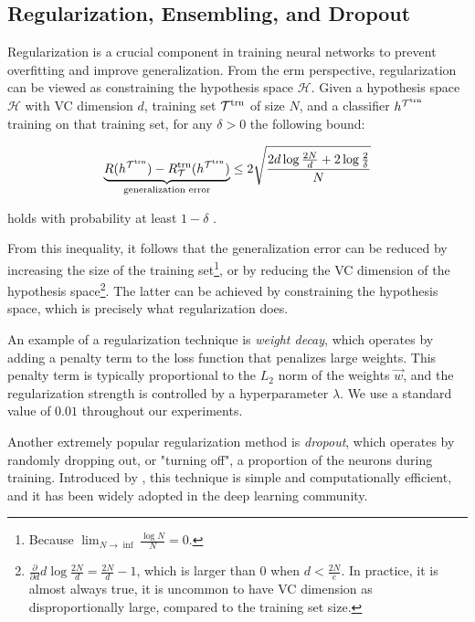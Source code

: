 \subsection{Regularization, Ensembling, and Dropout}
\label{sec:dropout}

Regularization is a crucial component in training neural networks to prevent overfitting and improve generalization.
From the \gls{erm} perspective, regularization can be viewed as constraining the hypothesis space $\mathcal{H}$.
Given a hypothesis space $\mathcal{H}$ with VC dimension $d$, training set $\mathcal{T}^\text{trn}$ of size $N$, and a classifier
$h^{\mathcal{T}^\text{trn}}$ training on that training set, for any $\delta > 0$ the following bound:

\begin{equation}
    \label{eq:generalization}
    \underbrace{R(h^{\mathcal{T}^\text{trn}}) - R_\mathcal{T}^\text{trn}(h^{\mathcal{T}^\text{trn}})}_\text{generalization error}
    \leq 2\sqrt{\frac{2 d \log \frac{2N}{d} + 2 \log \frac{2}{\delta}}{N}}
\end{equation}

holds with probability at least $1 - \delta$ \cite{generalization-bound}.

From this inequality, it follows that the generalization error can be reduced by increasing the size of the training
set\footnote{\vspace{5pt}Because $\lim_{N \rightarrow \inf}\frac{\log N}{N} = 0$.}, or by reducing the VC dimension of the
hypothesis space\footnote{$\frac{\partial}{\partial d} d \log \frac{2N}{d} = \frac{2N}{d} - 1$, which is larger than 0
    when $d < \frac{2N}{e}$. In practice, it is almost always true, it is uncommon to have VC dimension as
    disproportionally large, compared to the training set size.}. The latter can be achieved by constraining the
hypothesis space, which is precisely what regularization does.

An example of a regularization technique is \emph{weight decay}, which operates by adding a penalty term to the loss
function that penalizes large weights. This penalty term is typically proportional to the $L_2$ norm of the weights
$\vec{w}$, and the regularization strength is controlled by a hyperparameter $\lambda$. We use a standard value of
$0.01$ throughout our experiments.

Another extremely popular regularization method is \emph{dropout}, which operates by randomly dropping out, or "turning
off", a proportion of the neurons during training. Introduced by \cite{dropout}, this technique is simple and
computationally efficient, and it has been widely adopted in the deep learning community.

